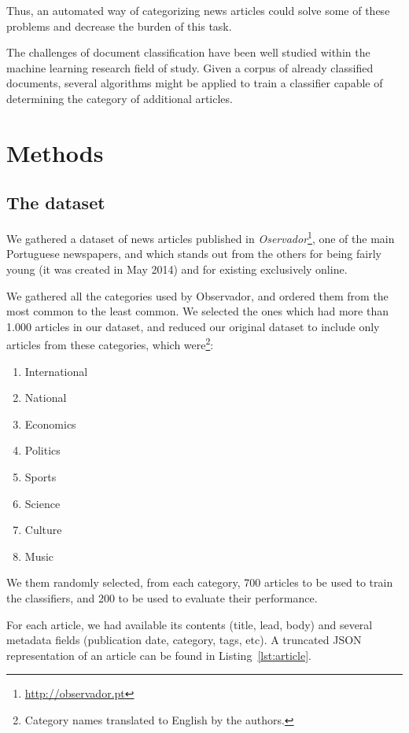 \documentclass[conference]{IEEEtran}
\begin{document}
Thus, an automated way of categorizing news articles could solve some
of these problems and decrease the burden of this task.

The challenges of document classification have been well studied
within the machine learning research field of study. Given a corpus of
already classified documents, several algorithms might be applied to
train a classifier capable of determining the category of additional
articles.

\section{Methods}
\subsection{The dataset}
We gathered a dataset of news articles published in
\textit{Oservador}\footnote{\url{http://observador.pt}}, one of the
main Portuguese newspapers, and which stands out from the others for
being fairly young (it was created in May 2014) and for existing
exclusively online.

We gathered all the categories used by Observador, and ordered them
from the most common to the least common. We selected the ones which
had more than 1.000 articles in our dataset, and reduced our original
dataset to include only articles from these categories, which
were\footnote{Category names translated to English by the authors.}:
\begin{enumerate}
    \item International
    \item National
    \item Economics
    \item Politics
    \item Sports
    \item Science
    \item Culture
    \item Music
\end{enumerate}

We them randomly selected, from each category, 700 articles to be used
to train the classifiers, and 200 to be used to evaluate their
performance.

For each article, we had available its contents (title, lead, body)
and several metadata fields (publication date, category, tags, etc). A
truncated JSON representation of an article can be found in
Listing~\ref{lst:article}.
\end{document}
